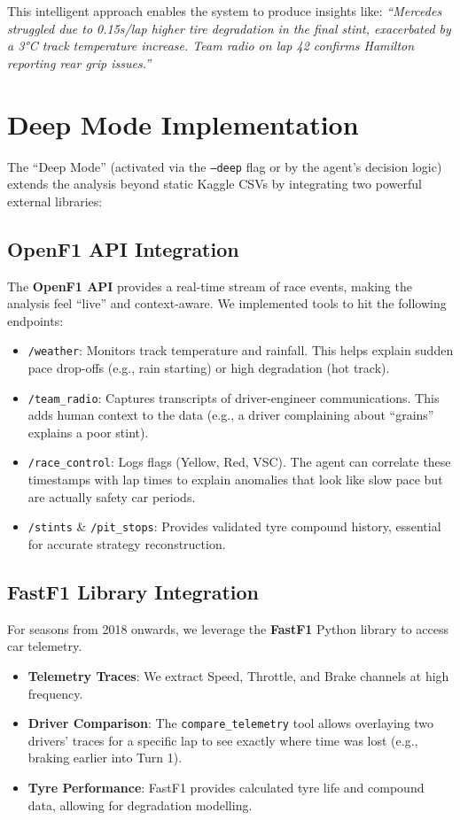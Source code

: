 \documentclass[11pt]{article}
\begin{document}
This intelligent approach enables the system to produce insights like: \textit{``Mercedes struggled due to 0.15s/lap higher tire degradation in the final stint, exacerbated by a 3°C track temperature increase. Team radio on lap 42 confirms Hamilton reporting rear grip issues.''}

\section{Deep Mode Implementation}
\label{sec:deep-mode}


The ``Deep Mode'' (activated via the \texttt{--deep} flag or by the agent's decision logic) extends the analysis beyond static Kaggle CSVs by integrating two powerful external libraries:

\subsection{OpenF1 API Integration}

The \textbf{OpenF1 API} provides a real-time stream of race events, making the analysis feel ``live'' and context-aware. We implemented tools to hit the following endpoints:

\begin{itemize}[leftmargin=1.5em]
    \item \texttt{/weather}: Monitors track temperature and rainfall. This helps explain sudden pace drop-offs (e.g., rain starting) or high degradation (hot track).
    \item \texttt{/team\_radio}: Captures transcripts of driver-engineer communications. This adds human context to the data (e.g., a driver complaining about ``grains'' explains a poor stint).
    \item \texttt{/race\_control}: Logs flags (Yellow, Red, VSC). The agent can correlate these timestamps with lap times to explain anomalies that look like slow pace but are actually safety car periods.
    \item \texttt{/stints} \& \texttt{/pit\_stops}: Provides validated tyre compound history, essential for accurate strategy reconstruction.
\end{itemize}

\subsection{FastF1 Library Integration}

For seasons from 2018 onwards, we leverage the \textbf{FastF1} Python library to access car telemetry.
\begin{itemize}[leftmargin=1.5em]
    \item \textbf{Telemetry Traces}: We extract Speed, Throttle, and Brake channels at high frequency.
    \item \textbf{Driver Comparison}: The \texttt{compare\_telemetry} tool allows overlaying two drivers' traces for a specific lap to see exactly where time was lost (e.g., braking earlier into Turn 1).
    \item \textbf{Tyre Performance}: FastF1 provides calculated tyre life and compound data, allowing for degradation modelling.
\end{itemize}
\end{document}
